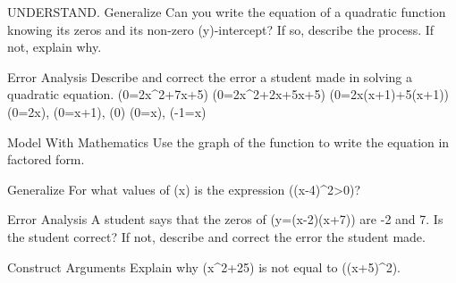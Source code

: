 \documentclass{article}
\newenvironment{practice}[2]{}{}        %
\newcommand{\answer}[1]{}               %
\newcommand{\placeholder}[2]{}          %
\newcommand{\te}[1]{}                   %
\begin{document}
\begin{practice}{10}{3}
UNDERSTAND. Generalize Can you write the equation of a quadratic function knowing its zeros and its non-zero (y)-intercept? If so, describe the process. If not, explain why.
\answer{Yes; if (b) and (c) are the zeros, the equation is (y=a(x-b)(x-c)). To find the value of (a), substitute 0 for (x) and the value for the (y)-intercept for (y), and solve for (a). Then multiply the factors.}
\end{practice}
\begin{practice}{11}{2}
Error Analysis Describe and correct the error a student made in solving a quadratic equation.
(0=2x^2+7x+5)
(0=2x^2+2x+5x+5)
(0=2x(x+1)+5(x+1))
(0=2x), (0=x+1), (0)
(0=x), (-1=x)
\te{A red X marks the student's work.}
\answer{The student misapplied the Zero Product Property. The student should have factored (2x(x+1)+5(x+1)) as ((2x+5)(x+1)) first, and then applied the Zero Product Property. Then (2x+5=0) leads to (x=-\frac{5}{2}), and (x+1=0) leads to (x=-1).}
\end{practice}
\begin{practice}{12}{1}
Model With Mathematics Use the graph of the function to write the equation in factored form.
\placeholder{graph}{Red upward parabola (y=(x+1)(x+6)), vertex (-3.5,-6.25), closed labeled points (-6,0),(-1,0),(0,6); upper ends arrowed. Black arrowed (x),(y) axes, origin O, square grid spacing 2, window [-10,10] each axis, labeled ticks -8,-4,4,8.}
\answer{(y=(x+1)(x+6))}
\end{practice}
\begin{practice}{13}{2}
Generalize For what values of (x) is the expression ((x-4)^2>0)?
\answer{for all values of (x) except 4}
\end{practice}
\begin{practice}{14}{2}
Error Analysis A student says that the zeros of (y=(x-2)(x+7)) are -2 and 7. Is the student correct? If not, describe and correct the error the student made.
\answer{The student is not correct; the zeros of a quadratic function in factored form are not simply the constants in the expression, but are found using the Zero Product Property, so (x-2=0) or (x=2), and (x+7=0) or (x=-7).}
\end{practice}
\begin{practice}{15}{2}
Construct Arguments Explain why (x^2+25) is not equal to ((x+5)^2).
\answer{the factored expression ((x+5)^2=(x+5)(x+5)=x^2+5x+5x+25=x^2+10x+25); The expression (x^2+25) does not factor over the real numbers.}
\end{practice}
\end{document}
